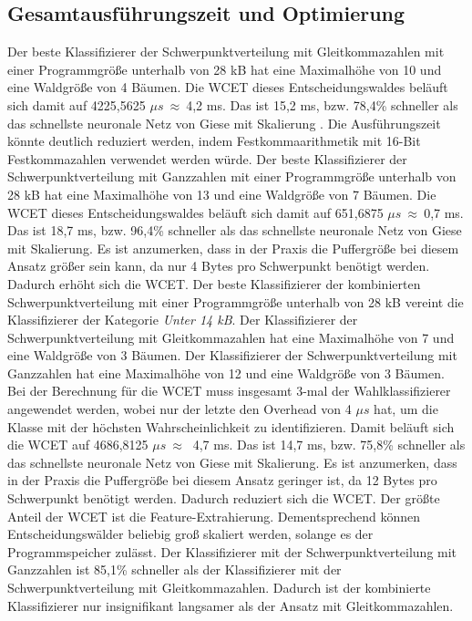 \subsection{Gesamtausführungszeit und Optimierung}
Der beste Klassifizierer der Schwerpunktverteilung mit Gleitkommazahlen mit einer Programmgröße unterhalb von 28 kB hat eine Maximalhöhe von 10 und eine Waldgröße von 4 Bäumen. Die WCET dieses Entscheidungswaldes
beläuft sich damit auf 4225,5625 $\mu s\ \approx\ $4,2 ms. Das ist 15,2 ms, bzw. 78,4\% schneller als das schnellste neuronale Netz von Giese mit Skalierung \cite{gieseThesis}. Die Ausführungszeit könnte deutlich reduziert
werden, indem Festkommaarithmetik mit 16-Bit Festkommazahlen verwendet werden würde.
\newline
\newline
Der beste Klassifizierer der Schwerpunktverteilung mit Ganzzahlen mit einer Programmgröße unterhalb von 28 kB hat eine Maximalhöhe von 13 und eine Waldgröße von 7 Bäumen. Die WCET dieses Entscheidungswaldes
beläuft sich damit auf 651,6875 $\mu s\ \approx\ $0,7 ms. Das ist 18,7 ms, bzw. 96,4\% schneller als das schnellste neuronale Netz von Giese mit Skalierung. Es ist anzumerken, dass in der Praxis die Puffergröße
bei diesem Ansatz größer sein kann, da nur 4 Bytes pro Schwerpunkt benötigt werden. Dadurch erhöht sich die WCET.
\newline
\newline
Der beste Klassifizierer der kombinierten Schwerpunktverteilung mit einer Programmgröße unterhalb von 28 kB vereint die Klassifizierer der Kategorie \textit{Unter 14 kB}. Der Klassifizierer der Schwerpunktverteilung
mit Gleitkommazahlen hat eine Maximalhöhe von 7 und eine Waldgröße von 3 Bäumen. Der Klassifizierer der Schwerpunktverteilung mit Ganzzahlen hat eine Maximalhöhe von 12 und eine Waldgröße von 3 Bäumen. Bei der
Berechnung für die WCET muss insgesamt 3-mal der Wahlklassifizierer angewendet werden, wobei nur der letzte den Overhead von 4 $\mu s$ hat, um die Klasse mit der höchsten Wahrscheinlichkeit zu identifizieren. Damit
beläuft sich die WCET auf 4686,8125 $\mu s\ \approx\ $ 4,7 ms. Das ist 14,7 ms, bzw. 75,8\% schneller als das schnellste neuronale Netz von Giese mit Skalierung. Es ist anzumerken, dass in der Praxis die Puffergröße
bei diesem Ansatz geringer ist, da 12 Bytes pro Schwerpunkt benötigt werden. Dadurch reduziert sich die WCET.
\newline
\newline
Der größte Anteil der WCET ist die Feature-Extrahierung. Dementsprechend können Entscheidungswälder beliebig groß skaliert werden, solange es der Programmspeicher zulässt. Der Klassifizierer mit der Schwerpunktverteilung
mit Ganzzahlen ist 85,1\% schneller als der Klassifizierer mit der Schwerpunktverteilung mit Gleitkommazahlen. Dadurch ist der kombinierte Klassifizierer nur insignifikant langsamer als der Ansatz mit Gleitkommazahlen.